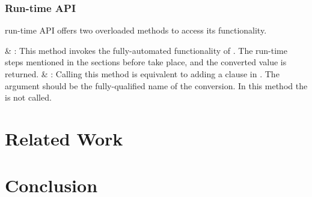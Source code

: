 \subsubsection{Run-time API}
\zamk run-time API offers two overloaded methods to access its functionality.

\begin{easylist}[itemize]
&  : This method invokes the fully-automated functionality of \zamk. 
The run-time steps mentioned in the sections before take place, and the converted value is returned.
&  : Calling this method is equivalent to adding a  clause in \gluer. 
The  argument should be the fully-qualified name of the conversion. 
In this method the  is not called.
\end{easylist}

\section{Related Work}
\section{Conclusion}




